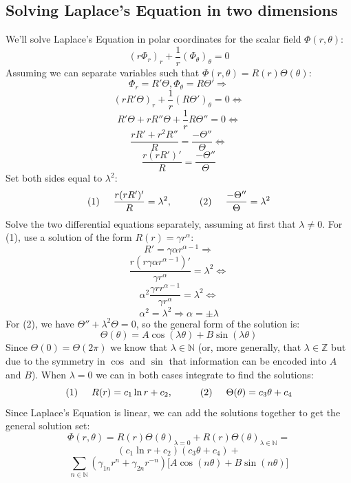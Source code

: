 \documentclass[aps,twocolumn,pre,nofootinbib]{revtex4-1}
\begin{document}
\subsection*{Solving Laplace's Equation in two dimensions}
We'll solve Laplace's Equation in polar coordinates for the scalar field $\Phi(r, \theta)$:
\[ \left( r \Phi_r \right)_r + \frac{1}{r} \left(\Phi_\theta \right)_\theta = 0 \]
Assuming we can separate variables such that $\Phi(r, \theta) = R(r)\Theta(\theta)$:
\[ \Phi_r = R'\Theta, \Phi_\theta = R\Theta' \Rightarrow \]
\[ (rR'\Theta)_r + \frac{1}{r}(R\Theta')_\theta = 0 \Leftrightarrow \]
\[ R'\Theta + rR''\Theta + \frac{1}{r}R\Theta'' = 0 \Leftrightarrow \]
\[ \frac{rR' + r^2 R''}{R} = \frac{- \Theta''}{\Theta} \Leftrightarrow \]
\[ \frac{r(rR')'}{R} = \frac{- \Theta''}{\Theta} \]
Set both sides equal to $\lambda^2$:
\[ (1) \hspace{0.5cm} \frac{r(rR')'}{R} = \lambda^2, \hspace{1cm} (2) \hspace{0.5cm} \frac{- \Theta''}{\Theta} = \lambda^2 \]
Solve the two differential equations separately, assuming at first that $\lambda \neq 0$. 
For (1), use a solution of the form $R(r) = \gamma r^\alpha$:
\[ R' = \gamma \alpha r^{\alpha - 1} \Rightarrow \]
\[ \frac{r(r\gamma \alpha r^{\alpha - 1})'}{\gamma r^\alpha} = \lambda^2 \Leftrightarrow \]
\[ \alpha^2 \frac{\gamma r r^{\alpha - 1}}{\gamma r^\alpha} = \lambda^2 \Leftrightarrow \]
\[ \alpha^2 = \lambda^2 \Rightarrow \alpha = \pm \lambda \]
For (2), we have $\Theta'' + \lambda^2 \Theta = 0$, so the general form of the solution is:
\[ \Theta(\theta) = A \cos(\lambda \theta) + B \sin(\lambda \theta) \]
Since $\Theta(0) = \Theta(2\pi)$ we know that $\lambda \in \mathbb{N}$ (or, more generally,
that $\lambda \in \mathbb{Z}$ but due to the symmetry in $\cos$ and $\sin$ that information can be encoded into $A$ and $B$).
When $\lambda = 0$ we can in both cases integrate to find the solutions:
\[ (1) \hspace{0.5cm} R(r) = c_1 \ln r + c_2,\hspace{1cm} (2)\hspace{0.5cm} \Theta(\theta) = c_3 \theta + c_4 \]
Since Laplace's Equation is linear, we can add the solutions together to get the general solution set:
\[ \Phi(r, \theta) = R(r)\Theta(\theta)_{\lambda = 0} + R(r)\Theta(\theta)_{\lambda \in \mathbb{N}} = \]
\[ (c_1 \ln r + c_2)(c_3 \theta + c_4) + \]
\[\sum_{n \in \mathbb{N}} (\gamma_{1n} r^n + \gamma_{2n} r^{-n}) 
\big[A \cos(n \theta) + B \sin(n \theta) \big] \]
\end{document}
